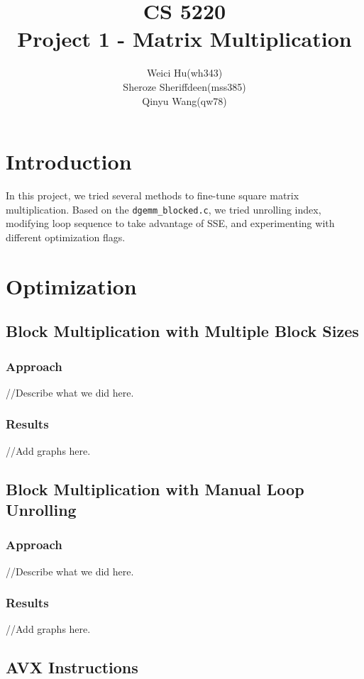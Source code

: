 \documentclass[11pt]{article}
\theoremstyle{plain}
\theoremstyle{definition}
\begin{document}
\title{CS 5220\\ Project 1 - Matrix Multiplication}
\author{Weici Hu(wh343)\\ Sheroze Sheriffdeen(mss385)\\ Qinyu Wang(qw78)}
\maketitle

\section{Introduction}
In this project, we tried several methods to fine-tune square matrix multiplication.
Based on the \texttt{dgemm\_blocked.c}, we tried unrolling index, modifying loop sequence to take advantage of SSE, and experimenting with different optimization flags.

\section{Optimization}
\subsection{Block Multiplication with Multiple Block Sizes}
\subsubsection{Approach}
//Describe what we did here.
\subsubsection{Results}
//Add graphs here.

\subsection{Block Multiplication with Manual Loop Unrolling}
\subsubsection{Approach}
//Describe what we did here.
\subsubsection{Results}
//Add graphs here.

\subsection{AVX Instructions}
\end{document}
